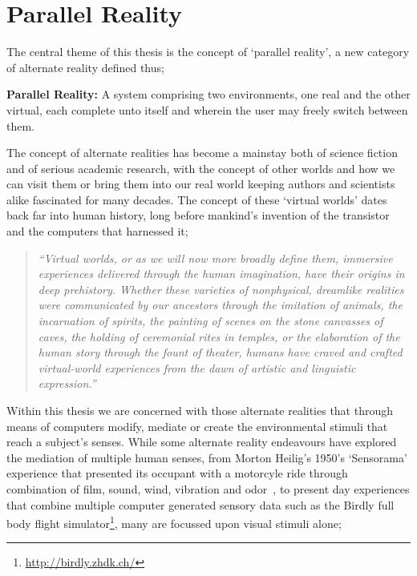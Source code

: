 
\section{Parallel Reality}

The central theme of this thesis is the concept of `parallel reality', a new category of alternate reality defined thus;

\vspace{7mm}

\textbf{Parallel Reality:} A system comprising two environments, one real and the other virtual, each complete unto itself and wherein the user may freely switch between them.

\vspace{7mm}


The concept of alternate realities has become a mainstay both of science fiction and of serious academic research, with the concept of other worlds and how we can visit them or bring them into our real world keeping authors and scientists alike fascinated for many decades. The concept of these `virtual worlds' dates back far into human history, long before mankind's invention of the transistor and the computers that harnessed it;

\begin{quote}
	\textit{``Virtual worlds, or as we will now more broadly define them, immersive experiences delivered through the human imagination, have their origins in deep prehistory. Whether these varieties of nonphysical, dreamlike realities were communicated by our ancestors through the imitation of animals, the incarnation of spirits, the painting of scenes on the stone canvasses of caves, the holding of ceremonial rites in temples, or the elaboration of the human story through the fount of theater, humans have craved and crafted virtual-world experiences from the dawn of artistic and linguistic expression.''}~\cite{Damer2014}
\end{quote}

Within this thesis we are concerned with those alternate realities that through means of computers modify, mediate or create the environmental stimuli that reach a subject's senses. While some alternate reality endeavours have explored the mediation of multiple human senses, from Morton Heilig's 1950's `Sensorama' experience that presented its occupant with a motorcyle ride through combination of film, sound, wind, vibration and odor~\cite{Rheingold1992}, to present day experiences that combine multiple computer generated sensory data such as the Birdly full body flight simulator\footnote{\url{http://birdly.zhdk.ch/}}, many are focussed upon visual stimuli alone;

